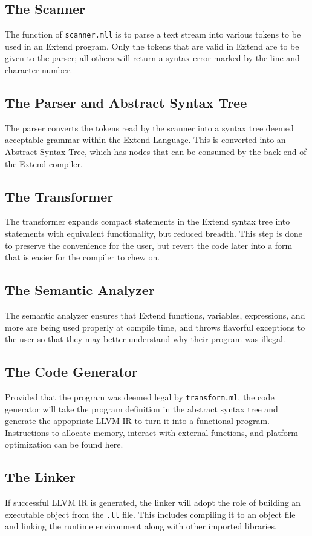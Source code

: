   \subsection{The Scanner}
  The function of \texttt{scanner.mll} is to parse a text stream into various tokens to be used in an Extend program.
  Only the tokens that are valid in Extend are to be given to the parser; all others will return a syntax error marked by the line and character number.

  \subsection{The Parser and Abstract Syntax Tree}
  The parser converts the tokens read by the scanner into a syntax tree deemed acceptable grammar within the Extend Language. This is converted into an Abstract Syntax Tree, which has nodes that can be consumed by the back end of the Extend compiler.

  \subsection{The Transformer}
  The transformer expands compact statements in the Extend syntax tree into statements with equivalent functionality, but reduced breadth. This step is done to preserve the convenience for the user, but revert the code later into a form that is easier for the compiler to chew on.

  \subsection{The Semantic Analyzer}
  The semantic analyzer ensures that Extend functions, variables, expressions, and more are being used properly at compile time, and throws flavorful exceptions to the user so that they may better understand why their program was illegal.

  \subsection{The Code Generator}
  Provided that the program was deemed legal by \texttt{transform.ml}, the code generator will take the program definition in the abstract syntax tree and generate the appopriate LLVM IR to turn it into a functional program. Instructions to allocate memory, interact with external functions, and platform optimization can be found here.

  \subsection{The Linker}
  If successful LLVM IR is generated, the linker will adopt the role of building an executable object from the \texttt{.ll} file. This includes compiling it to an object file and linking the runtime environment along with other imported libraries.

